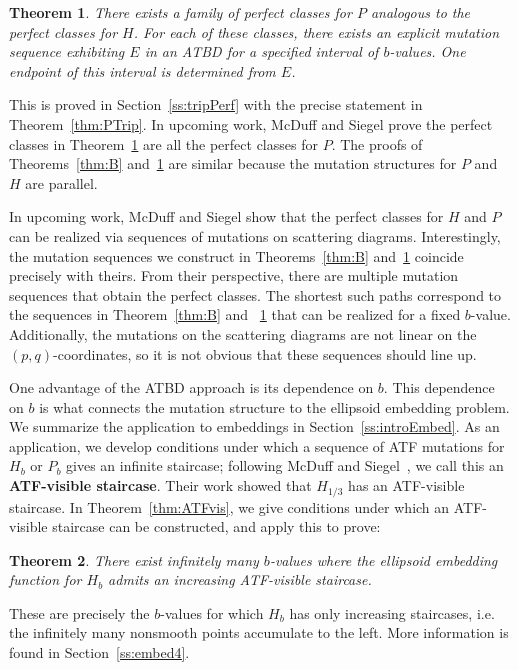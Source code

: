 \documentclass[11pt, reqno]{amsart}
\newtheorem{mainthm}{Theorem}
\theoremstyle{remark}
\numberwithin{equation}{subsection}
\numberwithin{figure}{section}
\theoremstyle{customremark}
\begin{document}
\begin{mainthm} \label{thm:C}
There exists a family of perfect classes for $P$ analogous to the perfect classes for $H$. For each of these classes, there exists an explicit mutation sequence exhibiting $E$ in an ATBD for a specified interval of $b$-values. One endpoint of this interval is determined from $E$.
\end{mainthm}

This is proved in Section~\ref{ss:tripPerf} with the precise statement in Theorem~\ref{thm:PTrip}. In upcoming work, McDuff and Siegel prove the perfect classes in Theorem~\ref{thm:C} are all the perfect classes for $P.$ The proofs of Theorems~\ref{thm:B} and~\ref{thm:C} are similar because the mutation structures for $P$ and $H$ are parallel.

 
In upcoming work, McDuff and Siegel show that the perfect classes for $H$ and $P$ can be realized via sequences of mutations on scattering diagrams. Interestingly, the mutation sequences we construct in Theorems~\ref{thm:B} and~\ref{thm:C} coincide precisely with theirs. From their perspective, there are multiple mutation sequences that obtain the perfect classes. The shortest such paths correspond to the sequences in Theorem~\ref{thm:B} and ~\ref{thm:C} that can be realized for a fixed $b$-value. Additionally, the mutations on the scattering diagrams are not linear on the $(p,q)$-coordinates, so it is not obvious that these sequences should line up. 

One advantage of the ATBD approach is its dependence on $b$. This dependence on $b$ is what connects the mutation structure to the ellipsoid embedding problem. We summarize the application to embeddings in Section~\ref{ss:introEmbed}. As an application, we develop conditions under which a sequence of ATF
mutations for \(H_b\) or \(P_b\) gives an infinite staircase; following McDuff and Siegel~\cite{McSi}, we call this an \textbf{ATF-visible staircase}. Their work showed that $H_{1/3}$ has an ATF-visible staircase. In Theorem~\ref{thm:ATFvis}, we give conditions under which an ATF-visible staircase can be constructed, and apply this to prove:
 
\begin{mainthm} \label{thm:D}
There exist infinitely many $b$-values where the ellipsoid embedding function for $H_b$ admits an increasing ATF-visible staircase.
\end{mainthm}

These are precisely the \(b\)-values for which \(H_b\) has only increasing staircases, i.e. the infinitely many nonsmooth points accumulate to the left. More information is found in Section~\ref{ss:embed4}. 
\end{document}
